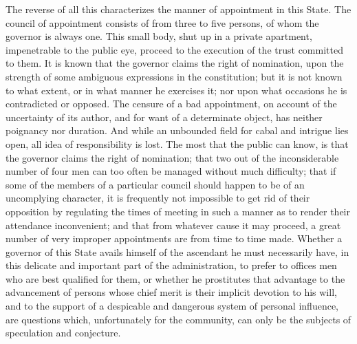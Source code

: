 The reverse of all this characterizes the manner of appointment in this State. 
The council of appointment consists of from three to five persons, of whom the governor is always one. 
This small body, shut up in a private apartment, impenetrable to the public eye, proceed to the execution of the trust committed to them. 
It is known that the governor claims the right of nomination, upon the strength of some ambiguous expressions in the constitution; but it is not known to what extent, or in what manner he exercises it; nor upon what occasions he is contradicted or opposed. 
The censure of a bad appointment, on account of the uncertainty of its author, and for want of a determinate object, has neither poignancy nor duration. 
And while an unbounded field for cabal and intrigue lies open, all idea of responsibility is lost. 
The most that the public can know, is that the governor claims the right of nomination; that two out of the inconsiderable number of four men can too often be managed without much difficulty; that if some of the members of a particular council should happen to be of an uncomplying character, it is frequently not impossible to get rid of their opposition by regulating the times of meeting in such a manner as to render their attendance inconvenient; and that from whatever cause it may proceed, a great number of very improper appointments are from time to time made. 
Whether a governor of this State avails himself of the ascendant he must necessarily have, in this delicate and important part of the administration, to prefer to offices men who are best qualified for them, or whether he prostitutes that advantage to the advancement of persons whose chief merit is their implicit devotion to his will, and to the support of a despicable and dangerous system of personal influence, are questions which, unfortunately for the community, can only be the subjects of speculation and conjecture.

